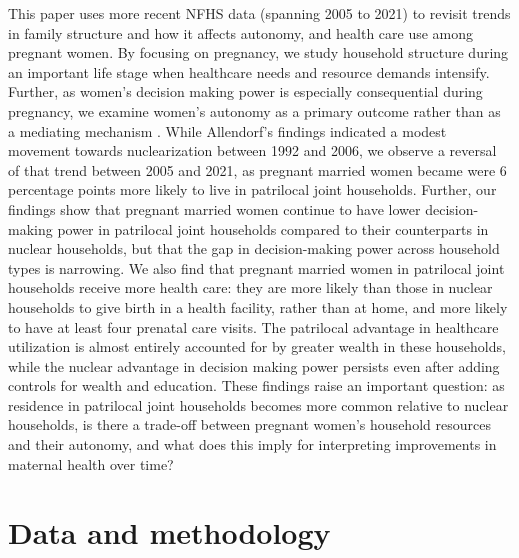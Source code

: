 \documentclass[12pt]{article}
\begin{document}
This paper uses more recent NFHS data (spanning 2005 to 2021) to revisit trends in family structure and how it affects autonomy, and health care use among pregnant women. By focusing on pregnancy, we study household structure during an important life stage when healthcare needs and resource demands intensify. Further, as women’s decision making power is especially consequential during pregnancy, we examine women’s autonomy \cite{hou2013effect} as a primary outcome rather than as a mediating mechanism . 
While Allendorf’s findings indicated a modest movement towards nuclearization between 1992 and 2006, we observe a reversal of that trend between 2005 and 2021, as pregnant married women became were 6 percentage points more likely to live in patrilocal joint households. Further, our findings show that pregnant married women continue to have lower decision-making power in patrilocal joint households compared to their counterparts in nuclear households, but that the gap in decision-making power across household types is narrowing.  We also find that pregnant married women in patrilocal joint households receive more health care: they are more likely than those in nuclear households to give birth in a health facility, rather than at home, and more likely to have  at least four prenatal care visits.  The patrilocal advantage in healthcare utilization is almost entirely accounted for by greater wealth in these households, while the nuclear advantage in decision making power persists even after adding controls for wealth and education. These findings raise an important question: as residence in patrilocal joint households becomes more common relative to nuclear households, is there a trade-off between pregnant women’s household resources and their autonomy, and what does this imply for interpreting improvements in maternal health over time?







\section{Data and methodology}
\end{document}
